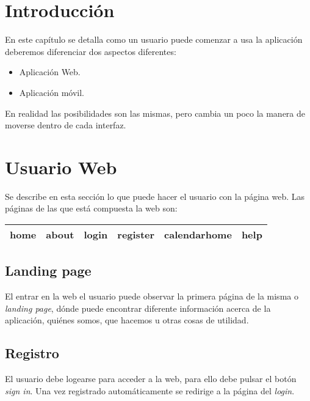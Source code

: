 
\section{Introducción}\label{introduccion-usuario}
En este capítulo se detalla como un usuario puede comenzar a usa la aplicación 
deberemos diferenciar dos aspectos diferentes:

\begin{itemize}
\tightlist
\item
  Aplicación Web. 
\item
  Aplicación móvil. 
\end{itemize}

En realidad las posibilidades son las mismas, pero cambia un poco la manera de moverse dentro de cada interfaz.

\section{Usuario Web}
Se describe en esta sección lo que puede hacer el usuario con la página web.  Las páginas de las que está compuesta la web son:

\begin{center}
\begin{tabular}{|c|c|c|c|c|c|}
  \hline
   home & about & login & register & calendarhome & help  \\
  \hline
\end{tabular}
\end{center}

\subsection{Landing page}
El entrar en la web el usuario puede observar la primera página de la misma o \emph{landing page}, dónde puede encontrar diferente información acerca de la aplicación, quiénes somos, que hacemos u otras cosas de utilidad.


\subsection{Registro}

El usuario debe logearse para acceder a la web, para ello debe pulsar el botón \emph{sign in}. Una vez registrado automáticamente se redirige a la página del \emph{login}.




